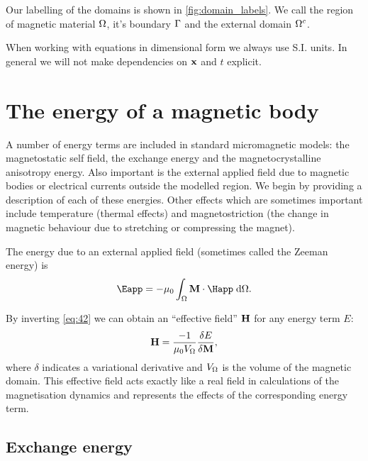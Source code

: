 Our labelling of the domains is shown in \cref{fig:domain_labels}.
We call the region of magnetic material $\Omega$, it's boundary ${\Gamma}$ and the external domain ${\Omega^c}$.

When working with equations in dimensional form we always use S.I. units.
In general we will not make dependencies on $\mathbf{x}$ and $t$ explicit.




\section{The energy of a magnetic body}
\label{sec:energy-magnetic-body}

A number of energy terms are included in standard micromagnetic models: the magnetostatic self field, the exchange energy and the magnetocrystalline anisotropy energy.
Also important is the external applied field due to magnetic bodies or electrical currents outside the modelled region.
We begin by providing a description of each of these energies.
Other effects which are sometimes important include temperature (thermal effects) and magnetostriction (the change in magnetic behaviour due to stretching or compressing the magnet).

The energy due to an external applied field (sometimes called the Zeeman energy) is 
\begin{equation}
  \label{eq:42}
  \Eapp = - \mu_0 \int_{\magd} \Mv \cdot \Happ \d \magd.
\end{equation}

By inverting \cref{eq:42} we can obtain an ``effective field'' $\mathbf{H}$ for any energy term $E$:
\begin{equation}
  \mathbf{H} = \dfrac{-1}{\mu_0V_{\Omega}} \dfrac{\delta E}{\delta \mathbf{M}},
\end{equation}
where $\delta$ indicates a variational derivative and $V_{\Omega}$ is the volume of the magnetic domain.
This effective field acts exactly like a real field in calculations of the magnetisation dynamics and represents the effects of the corresponding energy term.



\subsection{Exchange energy}


